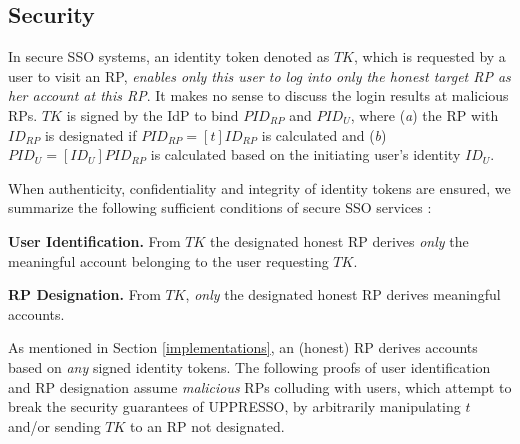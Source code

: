 \subsection{Security}
\label{analysis-security}

In secure SSO systems, an identity token denoted as $TK$, which is requested by a user to visit an RP,
    \emph{enables only this user to log into only the honest target RP as her account at this RP}. It makes no sense to discuss the login results at malicious RPs.
$TK$ is signed by the IdP to bind $PID_{RP}$ and $PID_U$,
where (\emph{a}) the RP with $ID_{RP}$ is designated if $PID_{RP} = [t]ID_{RP}$ is calculated
    and (\emph{b}) $PID_U = [ID_U]PID_{RP}$ is calculated based on the initiating user's identity $ID_U$.

When authenticity, confidentiality and integrity of identity tokens are ensured, we summarize the following sufficient conditions of secure SSO services \cite{FettKS14,BrowserID,SPRESSO}:

\noindent \textbf{User Identification.} %
From $TK$ the designated honest RP derives \emph{only} the meaningful account belonging to the user requesting $TK$.

\noindent \textbf{RP Designation.} From $TK$, \emph{only} the designated honest RP derives meaningful accounts.


As mentioned in Section \ref{implementations}, an (honest) RP derives accounts based on \emph{any} signed identity tokens.
The following proofs of user identification and RP designation assume \emph{malicious} RPs colluding with users,
                which attempt to break the security guarantees of UPPRESSO,
by arbitrarily manipulating $t$ and/or sending $TK$ to an RP not designated.

